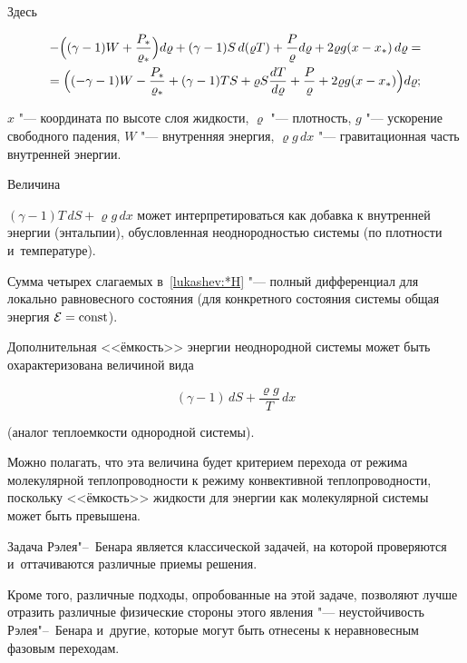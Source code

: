 Здесь

\begin{multline}

-\Bigl(

(\gamma-1) W+\frac{P_*}{\varrho_*}

\Bigr) d\varrho+(\gamma-1) S \, d(\varrho T)+\frac{P}{\varrho} d\varrho+2\varrho g (x-x_*) \, d\varrho= 

\\

=\Bigl(

(-\gamma-1) W-\frac{P_*}{\varrho_*}+(\gamma-1) TS+\varrho S \frac{dT}{d\varrho}+\frac{P}{\varrho}+2\varrho g(x-x_*) \Bigr) d\varrho;

\end{multline}

$x$ "--- координата по высоте слоя жидкости, $\varrho$ "--- плотность,  $g$ "--- ускорение свободного падения, $W$ "--- внутренняя энергия,  $\varrho g \, dx$ "--- гравитационная часть \linebreak внутренней энергии.  

Величина

$(\gamma-1) T\, dS + \varrho g  \,dx$ может интерпретироваться как добавка к внутренней энергии (энтальпии), обусловленная неоднородностью системы (по плотности и~температуре). 

Сумма четырех слагаемых в~\eqref{lukashev:*H} "--- полный дифференциал для локально равновесного состояния (для конкретного состояния системы общая энергия ${\cal E}={\rm const}$).

Дополнительная <<ёмкость>> энергии неоднородной системы может быть охарактеризована величиной вида

\begin{equation}

(\gamma-1)\, dS+\frac{\varrho g} T\, dx \label{lukashev:dE}

\end{equation}

(аналог теплоемкости однородной системы).

Можно полагать, что эта величина будет критерием перехода от режима молекулярной  теплопроводности к режиму конвективной теплопроводности, поскольку <<ёмкость>> жидкости для энергии как молекулярной системы может быть превышена.



Задача Рэлея"--~Бенара является классической задачей, на которой проверяются и~оттачиваются различные приемы решения. 

Кроме того, различные подходы, опробованные на этой задаче, позволяют лучше отразить различные физические стороны этого явления "---  неустойчивость Рэлея"--~Бенара и~другие, которые могут быть отнесены к неравновесным фазовым переходам. 

